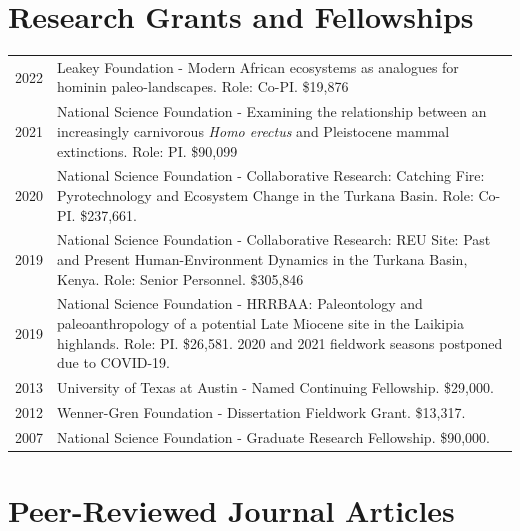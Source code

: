 \documentclass{article}
\begin{document}
\section*{Research Grants and Fellowships}
\begin{tabular}{p{}p{}}
2022 & Leakey Foundation - Modern African ecosystems as analogues for hominin paleo-landscapes. Role: Co-PI. \$19,876\\[4pt]
2021 & National Science Foundation - Examining the relationship between an increasingly carnivorous \emph{Homo erectus} and Pleistocene mammal extinctions. Role: PI. \$90,099\\[4pt]
2020 & National Science Foundation - Collaborative Research: Catching Fire: Pyrotechnology and Ecosystem Change in the Turkana Basin. Role: Co-PI. \$237,661.\\[4pt]
2019 &  National Science Foundation - Collaborative Research: REU Site: Past and Present Human-Environment Dynamics in the Turkana Basin, Kenya. Role: Senior Personnel. \$305,846\\[4pt]
2019 & National Science Foundation - HRRBAA: Paleontology and paleoanthropology of a potential Late Miocene site in the Laikipia highlands. Role: PI. \$26,581. 2020 and 2021 fieldwork seasons postponed due to COVID-19. \\[4pt]
2013 &  University of Texas at Austin - Named Continuing Fellowship. \$29,000.\\[4pt]
2012  & Wenner-Gren Foundation - Dissertation Fieldwork Grant. \$13,317.\\[4pt]
2007 &  National Science Foundation - Graduate Research Fellowship. \$90,000.\\[4pt]

\end{tabular}

\section*{Peer-Reviewed Journal Articles}

\end{document}
